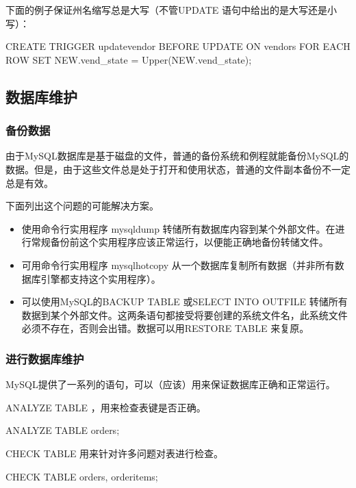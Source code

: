 下面的例子保证州名缩写总是大写（不管UPDATE 语句中给出的是大写还是小写）：

\begin{sql}
CREATE TRIGGER updatevendor BEFORE UPDATE ON vendors
    FOR EACH ROW SET NEW.vend_state = Upper(NEW.vend_state);
\end{sql}

\subsection{数据库维护}

\subsubsection{备份数据}

由于MySQL数据库是基于磁盘的文件，普通的备份系统和例程就能备份MySQL的数据。但是，由于这些文件总是处于打开和使用状态，普通的文件副本备份不一定总是有效。

下面列出这个问题的可能解决方案。

\begin{itemize}
    \item 使用命令行实用程序 mysqldump 转储所有数据库内容到某个外部文件。在进行常规备份前这个实用程序应该正常运行，以便能正确地备份转储文件。
    \item 可用命令行实用程序 mysqlhotcopy 从一个数据库复制所有数据（并非所有数据库引擎都支持这个实用程序）。
    \item 可以使用MySQL的BACKUP TABLE 或SELECT INTO OUTFILE 转储所有数据到某个外部文件。这两条语句都接受将要创建的系统文件名，此系统文件必须不存在，否则会出错。数据可以用RESTORE TABLE 来复原。
\end{itemize}

\subsubsection{进行数据库维护}

MySQL提供了一系列的语句，可以（应该）用来保证数据库正确和正常运行。

ANALYZE TABLE ，用来检查表键是否正确。

\begin{sql}
ANALYZE TABLE orders;
\end{sql}

CHECK TABLE 用来针对许多问题对表进行检查。

\begin{sql}
CHECK TABLE orders, orderitems;
\end{sql}

